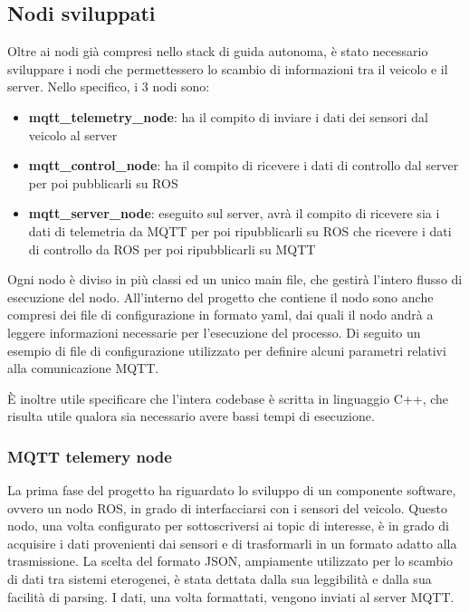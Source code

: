 \subsection{Nodi sviluppati}
Oltre ai nodi già compresi nello stack di guida autonoma, è stato necessario sviluppare i nodi che permettessero lo scambio di informazioni tra il veicolo e il server. Nello specifico, i 3 nodi sono:
\begin{itemize}
    \item \textbf{mqtt\_telemetry\_node}: ha il compito di inviare i dati dei sensori dal veicolo al server
    \item \textbf{mqtt\_control\_node}: ha il compito di ricevere i dati di controllo dal server per poi pubblicarli su ROS
    \item \textbf{mqtt\_server\_node}: eseguito sul server, avrà il compito di ricevere sia i dati di telemetria da MQTT per poi ripubblicarli su ROS che ricevere i dati di controllo da ROS per poi ripubblicarli su MQTT
\end{itemize}

\noindent Ogni nodo è diviso in più classi ed un unico main file, che gestirà l'intero flusso di esecuzione del nodo. All'interno del progetto che contiene il nodo sono anche compresi dei file di configurazione in formato yaml, dai quali il nodo andrà a leggere informazioni necessarie per l'esecuzione del processo. Di seguito un esempio di file di configurazione utilizzato per definire alcuni parametri relativi alla comunicazione MQTT.



\noindent È inoltre utile specificare che l'intera codebase è scritta in linguaggio C++, che risulta utile qualora sia necessario avere bassi tempi di esecuzione.

\subsubsection{MQTT telemery node} \label{mqtt_telemetry_node}
La prima fase del progetto ha riguardato lo sviluppo di un componente software, ovvero un nodo ROS, in grado di interfacciarsi con i sensori del veicolo. Questo nodo, una volta configurato per sottoscriversi ai topic di interesse, è in grado di acquisire i dati provenienti dai sensori e di trasformarli in un formato adatto alla trasmissione. La scelta del formato JSON, ampiamente utilizzato per lo scambio di dati tra sistemi eterogenei, è stata dettata dalla sua leggibilità e dalla sua facilità di parsing. I dati, una volta formattati, vengono inviati al server MQTT.

